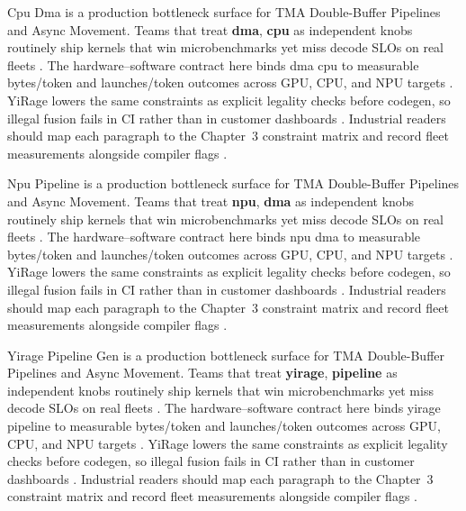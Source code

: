 Cpu Dma is a production bottleneck surface for TMA Double-Buffer Pipelines and Async Movement. Teams that treat \textbf{dma}, \textbf{cpu} as independent knobs routinely ship kernels that win microbenchmarks yet miss decode SLOs on real fleets \citep{dlbook,nvidia2024cudagraphs}. The hardware--software contract here binds dma cpu to measurable bytes/token and launches/token outcomes across GPU, CPU, and NPU targets \citep{dao2022flashattention,liu2024deepseekv3}. YiRage lowers the same constraints as explicit legality checks before codegen, so illegal fusion fails in CI rather than in customer dashboards \citep{kwon2023vllm,patel2025llminference}. Industrial readers should map each paragraph to the Chapter~3 constraint matrix and record fleet measurements alongside compiler flags \citep{nvidia2024cudagraphs,taxbreak2026}.

Npu Pipeline is a production bottleneck surface for TMA Double-Buffer Pipelines and Async Movement. Teams that treat \textbf{npu}, \textbf{dma} as independent knobs routinely ship kernels that win microbenchmarks yet miss decode SLOs on real fleets \citep{dao2022flashattention,liu2024deepseekv3}. The hardware--software contract here binds npu dma to measurable bytes/token and launches/token outcomes across GPU, CPU, and NPU targets \citep{kwon2023vllm,patel2025llminference}. YiRage lowers the same constraints as explicit legality checks before codegen, so illegal fusion fails in CI rather than in customer dashboards \citep{nvidia2024cudagraphs,taxbreak2026}. Industrial readers should map each paragraph to the Chapter~3 constraint matrix and record fleet measurements alongside compiler flags \citep{liu2024deepseekv3,memoryfloor2026}.

Yirage Pipeline Gen is a production bottleneck surface for TMA Double-Buffer Pipelines and Async Movement. Teams that treat \textbf{yirage}, \textbf{pipeline} as independent knobs routinely ship kernels that win microbenchmarks yet miss decode SLOs on real fleets \citep{kwon2023vllm,patel2025llminference}. The hardware--software contract here binds yirage pipeline to measurable bytes/token and launches/token outcomes across GPU, CPU, and NPU targets \citep{nvidia2024cudagraphs,taxbreak2026}. YiRage lowers the same constraints as explicit legality checks before codegen, so illegal fusion fails in CI rather than in customer dashboards \citep{liu2024deepseekv3,memoryfloor2026}. Industrial readers should map each paragraph to the Chapter~3 constraint matrix and record fleet measurements alongside compiler flags \citep{patel2025llminference,nvidia2022hopper}.

